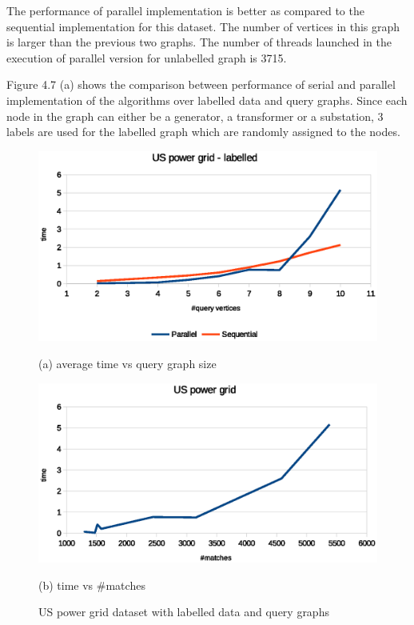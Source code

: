 The performance of parallel implementation is better as compared to the sequential implementation for this dataset. The number of vertices in this graph is larger than the previous two graphs. The number of threads launched in the execution of parallel version for unlabelled graph is 3715.

Figure 4.7 (a) shows the comparison between performance of serial and parallel implementation of the algorithms over labelled data and query graphs. Since each node in the graph can either be a generator, a transformer or a substation, 3 labels are used for the labelled graph which are randomly assigned to the nodes.

\begin{figure}[h!]
    \centering
    \begin{minipage}[b]{.45\textwidth}
        \hspace*{-0.5in}
        \includegraphics[scale=0.55]{images/USpower_labelled.eps}
        \caption*{(a) average time vs query graph size}        
    \end{minipage} \hfill  
    \begin{minipage}[b]{.45\textwidth}
        \hspace*{-0.2in}
        \includegraphics[scale=0.55]{images/USpower_labelled_tpm.eps}
        \caption*{(b) time vs \#matches}       
    \end{minipage}   
\caption{US power grid dataset with labelled data and query graphs}
\label{fig:distmx}
\end{figure}


